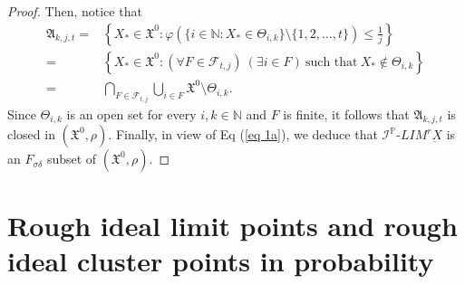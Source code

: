 \documentclass[reqno]{amsart}
\begin{document}
\begin{proof}
	Then, notice that 
	\begin{align*}
		\mathfrak{A}_{k,j,t}=&\left\{X_*\in\mathfrak{X^0}:  \varphi(\{i\in\mathbb{N}:X_*\in \Theta_{i,k} \}\setminus\{1,2,...,t\})\leq\frac{1}{j}\right\}\\
		=&\left\{X_*\in\mathfrak{X^0}: (\forall F\in \mathscr{F}_{t,j})~(\exists i\in F)~\mbox{such that}~X_*\notin \Theta_{i,k}\right\}\\
		=& \bigcap_{F\in \mathscr{F}_{t,j}} \bigcup_{i\in F} \mathfrak{X^0}\setminus \Theta_{i,k}.
	\end{align*}
	Since $\Theta_{i,k}$ is an open set for every $i,k\in\mathbb{N}$ and $F$ is finite, it follows that  $\mathfrak{A}_{k,j,t}$  is  closed in  $(\mathfrak{X^0},\rho)$. Finally, in view of Eq (\ref{eq 1a}), we deduce that $\mathcal{I}^{\mathbb{P}}$-$LIM^r\underbar{X}$  is an $F_{\sigma\delta}$ subset of $(\mathfrak{X^0},\rho)$.
\end{proof}
\section{Rough ideal limit points and rough ideal cluster points in probability}\label{secti3}
\end{document}
